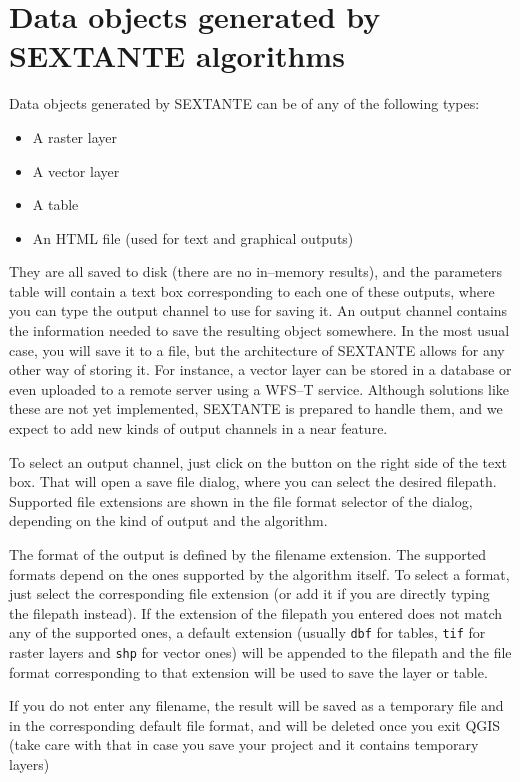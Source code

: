 \section{Data objects generated by SEXTANTE algorithms}

Data objects generated by SEXTANTE can be of any of the following types:

\begin{itemize}
 \item A raster layer
\item A vector layer
\item A table
\item An HTML file (used for text and graphical outputs)
\end{itemize}

They are all saved to disk (there are no in--memory results), and the parameters table will contain a text box corresponding to each one of these outputs, where you can type the output channel to use for saving it. An output channel contains the information needed to save the resulting object somewhere. In the most usual case, you will save it to a file, but the architecture of SEXTANTE allows for any other way of storing it. For instance, a vector layer can be stored in a database or even uploaded to a remote server using a WFS--T service. Although solutions like these are not yet implemented, SEXTANTE is prepared to handle them, and we expect to add new kinds of output channels in a near feature.

To select an output channel, just click on the button on the right side of the text box. That will open a save file dialog, where you can select the desired filepath. Supported file extensions are shown in the file format selector of the dialog, depending on the kind of output and the algorithm.

The format of the output is defined by the filename extension. The supported formats depend on the ones supported by the algorithm itself. To select a format, just select the corresponding file extension (or add it if you are directly typing the filepath instead). If the extension of the filepath you entered does not match any of the supported ones, a default extension (usually \texttt{dbf} for tables, \texttt{tif} for raster layers and \texttt{shp} for vector ones) will be appended to the filepath and the file format corresponding to that extension will be used to save the layer or table.

If you do not enter any filename, the result will be saved as a temporary file and in the corresponding default file format, and will be deleted once you exit QGIS (take care with that in case you save your project and it contains temporary layers)

